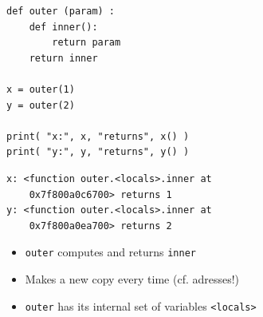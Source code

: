 \begin{frame}[fragile]
%
\begin{tcbraster}[raster columns=2,
                  raster equal height,
                  nobeforeafter,
                  raster column skip=0.5cm]
\begin{codebox}
\begin{verbatim}
def outer (param) :
    def inner():
        return param
    return inner

x = outer(1)
y = outer(2)

print( "x:", x, "returns", x() )
print( "y:", y, "returns", y() )
\end{verbatim}
\end{codebox}
%
\begin{cmdbox}
\begin{verbatim}
x: <function outer.<locals>.inner at 
    0x7f800a0c6700> returns 1
y: <function outer.<locals>.inner at
    0x7f800a0ea700> returns 2
\end{verbatim}
\end{cmdbox}
\end{tcbraster}
%
\begin{itemize}
\item \texttt{outer} computes and returns \texttt{inner}
\item Makes a new copy every time (cf. adresses!)
\item \texttt{outer} has its internal set of variables \texttt{<locals>}
\end{itemize}
%
\end{frame}


